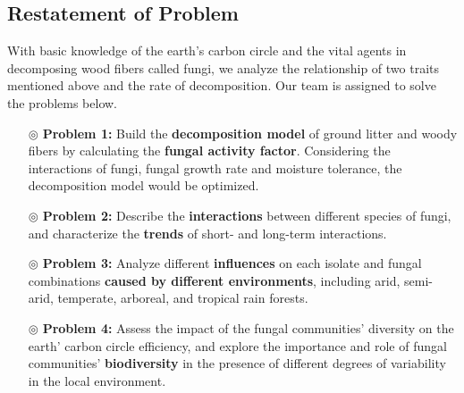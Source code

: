\subsection{Restatement of Problem}
With basic knowledge of the earth's carbon circle and the vital agents in decomposing wood fibers called fungi, we analyze the relationship of two traits mentioned above and the rate of decomposition. Our team is assigned to solve the problems below.
\begin{itemize}
  \item[$\circledcirc$] \textbf{Problem 1:} Build the \textbf{decomposition model} of ground litter and woody fibers by calculating the \textbf{fungal activity factor}. Considering the interactions of fungi, fungal growth rate and moisture tolerance, the decomposition model would be optimized.
  \item[$\circledcirc$] \textbf{Problem 2:} Describe the \textbf{interactions} between different species of fungi, and characterize the \textbf{trends} of short- and long-term interactions.
  \item[$\circledcirc$] \textbf{Problem 3:} Analyze different \textbf{influences} on each isolate and fungal combinations \textbf{caused by different environments}, including arid, semi-arid, temperate, arboreal, and tropical rain forests.
  \item[$\circledcirc$] \textbf{Problem 4:} Assess the impact of the fungal communities' diversity on the earth' carbon circle efficiency, and explore the importance and role of fungal communities' \textbf{biodiversity} in the presence of different degrees of variability in the local environment.
\end{itemize}